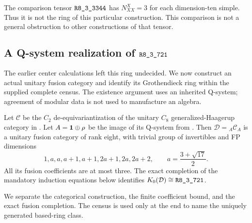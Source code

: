 \begin{remark}
The comparison tensor $\sha{R8_3_3344}$ has
$N_{XX}^{X}=3$ for each dimension-ten simple. Thus it is not the
ring of this particular construction. This comparison is not a
general obstruction to other constructions of that tensor.
\end{remark}

\subsection{A Q-system realization of \texorpdfstring{$\sha{R8_3_721}$}{R8-3-721}}
\label{sec:r721-qsystem-model}
The earlier center calculations left this ring undecided. We now construct
an actual unitary fusion category and identify its Grothendieck ring within
the supplied complete census. The existence argument uses an inherited
Q-system; agreement of modular data is not used to manufacture an algebra.

\begin{theorem}
\label{thm:r721-qsystem-model}
Let $\mathcal C$ be the $C_2$ de-equivariantization of the unitary
$C_8$ generalized-Haagerup category in
\cite[Example~4.4 and Section~6]{GrossmanIzumiCentersNext}.
Let $A=\mathbf1\oplus\rho$ be the image of its Q-system from
\cite[equations~(2.21)--(2.22)]{GrossmanIzumiCentersNext}.
Then $\mathcal D={}_A\mathcal C_A$ is a unitary fusion category of rank eight,
with trivial group of invertibles and FP dimensions
\[
 1,a,a,a+1,a+1,2a+1,2a,2a+2,
 \qquad a=\frac{3+\sqrt{17}}2.
\]
All its fusion coefficients are at most three. The exact completion of the mandatory induction equations below identifies
$K_0(\mathcal D)\cong\sha{R8_3_721}$.
\end{theorem}

We separate the categorical construction, the finite coefficient bound,
and the exact fusion completion. The census is used only at the end to
name the uniquely generated based-ring class.

